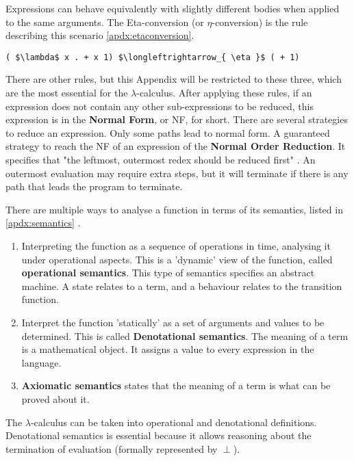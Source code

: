 Expressions can behave equivalently with slightly different bodies when applied to the same arguments. The Eta-conversion (or $\eta$-conversion) is the rule describing this scenario \ref{apdx:etaconversion}.

\begin{lstlisting}[caption={Eta conversion}, captionpos=b, mathescape=true, label={apdx:etaconversion}]
  ( $\lambda$ x . + x 1) $\longleftrightarrow_{ \eta }$ ( + 1) 
\end{lstlisting}

There are other rules, but this Appendix will be restricted to these three, which are the most essential for the $\lambda$-calculus. After applying these rules, if an expression does not contain any other sub-expressions to be reduced, this expression is in the \textbf{Normal Form}, or NF, for short. There are several strategies to reduce an expression. Only some paths lead to normal form. A guaranteed strategy to reach the NF of an expression of the \textbf{Normal Order Reduction}. It specifies that "the leftmost, outermost redex should be reduced first" \cite{peyton1987implementation}. An outermost evaluation may require extra steps, but it will terminate if there is any path that leads the program to terminate.

There are multiple ways to analyse a function in terms of its semantics, listed in \ref{apdx:semantics} \cite{pierce2002types}.

\begin{enumerate}\label{apdx:semantics}
  \item Interpreting the function as a sequence of operations in time, analysing it under operational aspects. This is a 'dynamic' view of the function, called \textbf{operational semantics}. This type of semantics specifies an abstract machine. A state relates to a term, and a behaviour relates to the transition function.
  \item Interpret the function 'statically' as a set of arguments and values to be determined. This is called \textbf{Denotational semantics}. The meaning of a term is a mathematical object. It assigns a value to every expression in the language.
  \item \textbf{Axiomatic semantics} states that the meaning of a term is what can be proved about it.
\end{enumerate} 

The $\lambda$-calculus can be taken into operational and denotational definitions. Denotational semantics is essential because it allows reasoning about the termination of evaluation (formally represented by $ \perp $).

